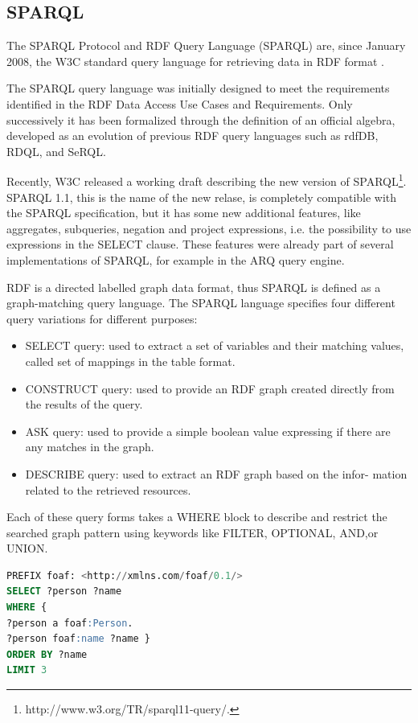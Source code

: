 \subsection{SPARQL}\label{sec:sparql}

The SPARQL Protocol and RDF Query Language (SPARQL) are, since January 2008, the W3C standard query language for retrieving data in RDF format \cite{prudhommeaux_sparql_2008}.

The SPARQL query language was initially designed to meet the requirements identified in the RDF Data Access Use Cases and Requirements. Only successively it has been formalized through the definition of an official algebra, developed as an evolution of previous RDF query languages such as rdfDB, RDQL, and SeRQL.

Recently, W3C released a working draft describing the new version of SPARQL\footnote{http://www.w3.org/TR/sparql11-query/.}. SPARQL 1.1, this is the name of the new relase, is completely compatible with the SPARQL specification, but it has some new additional features, like aggregates, subqueries, negation and project expressions, i.e. the possibility to use expressions in the SELECT clause. These features were already part of several implementations of SPARQL, for example in the ARQ query engine. 

RDF is a directed labelled graph data format, thus SPARQL is defined as a graph-matching query language. The SPARQL language specifies four different query variations for different purposes:
\begin{itemize}
\item SELECT query: used to extract a set of variables and their matching values, called set of mappings in the table format.
\item CONSTRUCT query: used to provide an RDF graph created directly from the results of the query.
\item ASK query: used to provide a simple boolean value expressing if there are any matches in the graph.
\item DESCRIBE query: used to extract an RDF graph based on the infor- mation related to the retrieved resources.
\end{itemize}

Each of these query forms takes a WHERE block to describe and restrict the searched graph pattern using keywords like FILTER, OPTIONAL, AND,or UNION.

\pagebreak

\begin{lstlisting}[language=SQL, caption=An example of a simple SPARQL query , keywords={PREFIX,SELECT,WHERE,ORDER,BY, LIMIT }, label=code:sparql]
PREFIX foaf: <http://xmlns.com/foaf/0.1/> 
SELECT ?person ?name
WHERE {
?person a foaf:Person.
?person foaf:name ?name }
ORDER BY ?name 
LIMIT 3
\end{lstlisting}

